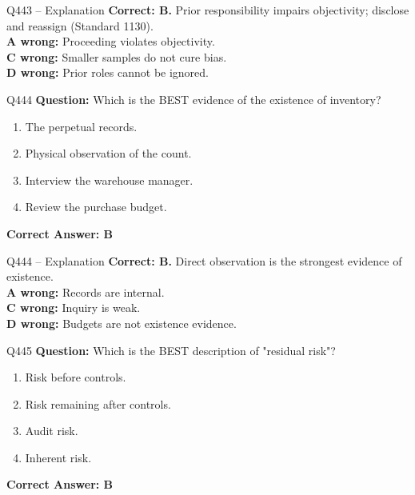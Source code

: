 \documentclass[aspectratio=169,10pt]{beamer}
\begin{document}
	\begin{frame}[t]{Q443 -- Explanation}
		\small
		\textbf{Correct: B.} Prior responsibility impairs objectivity; disclose and reassign (Standard 1130). \\[4pt]
		\textbf{A wrong:} Proceeding violates objectivity. \\[2pt]
		\textbf{C wrong:} Smaller samples do not cure bias. \\[2pt]
		\textbf{D wrong:} Prior roles cannot be ignored.
	\end{frame}
	
	\begin{frame}[t]{Q444}
		\small
		\textbf{Question:} Which is the BEST evidence of the existence of inventory?
		\begin{enumerate}[label=\Alph*.,itemsep=1pt,topsep=2pt]
			\item The perpetual records.
			\item Physical observation of the count.
			\item Interview the warehouse manager.
			\item Review the purchase budget.
		\end{enumerate}
		\vspace{4pt}
		\textbf{Correct Answer: B}
	\end{frame}
	
	\begin{frame}[t]{Q444 -- Explanation}
		\small
		\textbf{Correct: B.} Direct observation is the strongest evidence of existence. \\[4pt]
		\textbf{A wrong:} Records are internal. \\[2pt]
		\textbf{C wrong:} Inquiry is weak. \\[2pt]
		\textbf{D wrong:} Budgets are not existence evidence.
	\end{frame}
	
	\begin{frame}[t]{Q445}
		\small
		\textbf{Question:} Which is the BEST description of "residual risk"?
		\begin{enumerate}[label=\Alph*.,itemsep=1pt,topsep=2pt]
			\item Risk before controls.
			\item Risk remaining after controls.
			\item Audit risk.
			\item Inherent risk.
		\end{enumerate}
		\vspace{4pt}
		\textbf{Correct Answer: B}
	\end{frame}
	
\end{document}
